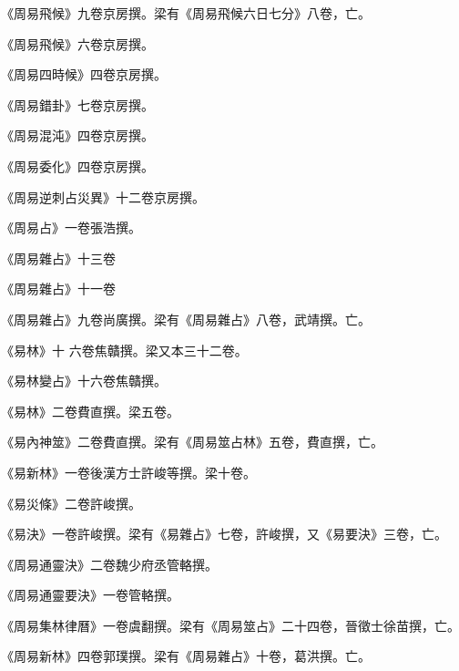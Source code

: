 \begin{pinyinscope}
 《周易飛候》九卷京房撰。梁有《周易飛候六日七分》八卷，亡。



 《周易飛候》六卷京房撰。



 《周易四時候》四卷京房撰。



 《周易錯卦》七卷京房撰。



 《周易混沌》四卷京房撰。



 《周易委化》四卷京房撰。



 《周易逆刺占災異》十二卷京房撰。



 《周易占》一卷張浩撰。



 《周易雜占》十三卷



 《周易雜占》十一卷



 《周易雜占》九卷尚廣撰。梁有《周易雜占》八卷，武靖撰。亡。



 《易林》十
 六卷焦贛撰。梁又本三十二卷。



 《易林變占》十六卷焦贛撰。



 《易林》二卷費直撰。梁五卷。



 《易內神筮》二卷費直撰。梁有《周易筮占林》五卷，費直撰，亡。



 《易新林》一卷後漢方士許峻等撰。梁十卷。



 《易災條》二卷許峻撰。



 《易決》一卷許峻撰。梁有《易雜占》七卷，許峻撰，又《易要決》三卷，亡。



 《周易通靈決》二卷魏少府丞管輅撰。



 《周易通靈要決》一卷管輅撰。



 《周易集林律曆》一卷虞翻撰。梁有《周易筮占》二十四卷，晉徵士徐苗撰，亡。



 《周易新林》四卷郭璞撰。梁有《周易雜占》十卷，葛洪撰。亡。




\end{pinyinscope}
